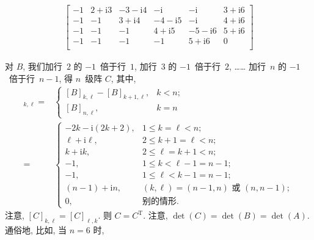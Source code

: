 \documentclass[../libro.tex]{subfiles}
\begin{document}
\begin{example}
\begin{align*}
\begin{bmatrix}
            -1             & 2+\mathrm{i}3  & -3-\mathrm{i}4 & -\mathrm{i}    & -\mathrm{i}    & 3+\mathrm{i}6 \\
            -1             & -1             & 3+\mathrm{i}4  & -4-\mathrm{i}5 & -\mathrm{i}    & 4+\mathrm{i}6 \\
            -1             & -1             & -1             & 4+\mathrm{i}5  & -5-\mathrm{i}6 & 5+\mathrm{i}6 \\
            -1             & -1             & -1             & -1             & 5+\mathrm{i}6  & 0             \\
        \end{bmatrix}
    \end{align*}

    对 \(B\), 我们加行~\(2\) 的 \(-1\)~倍于行~\(1\),
    加行~\(3\) 的 \(-1\)~倍于行~\(2\),
    ……
    加行~\(n\) 的 \(-1\)~倍于行~\(n-1\),
    得 \(n\)~级阵 \(C\),
    其中,
    \begin{align*}
        [C]_{k,\ell}
        = {} &
        \begin{cases}
            [B]_{k,\ell} - [B]_{k+1,\ell}, & k < n; \\
            [B]_{n,\ell},                  & k = n
        \end{cases}
        \\
        = {} &
        \begin{cases}
            -2k - \mathrm{i} (2k+2), & 1 \leq k = \ell < n;                                \\
            \ell + \mathrm{i} \ell,  & 2 \leq k + 1 = \ell < n;                            \\
            k + \mathrm{i} k,        & 2 \leq \ell = k + 1 < n;                            \\
            -1,                      & 1 \leq k < \ell - 1 = n - 1;                        \\
            -1,                      & 1 \leq \ell < k - 1 = n - 1;                        \\
            (n-1) + \mathrm{i} n,    & \text{\((k, \ell) = (n - 1, n)\) 或 \((n, n - 1)\)}; \\
            0,                       & \text{别的情形}.
        \end{cases}
    \end{align*}
    注意, \([C]_{k,\ell} = [C]_{\ell,k}\).
    则 \(C = C^{\mathrm{T}}\).
    注意, \(\det {(C)} = \det {(B)} = \det {(A)}\).
    通俗地, 比如, 当 \(n = 6\) 时,
    \begin{align*}

\end{align*}
\end{example}
\end{document}
